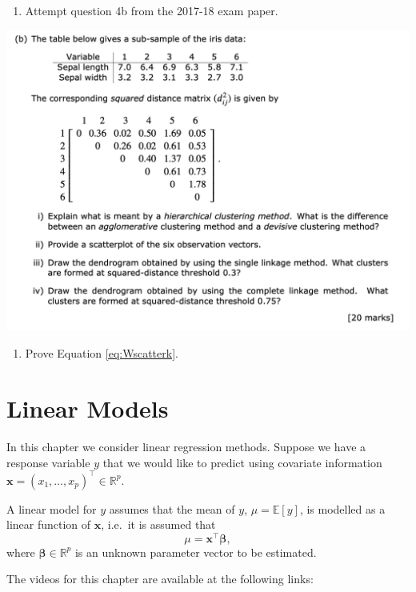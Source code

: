 \documentclass[
]{book}
\providecommand{\tightlist}{%
  \setlength{\itemsep}{0pt}\setlength{\parskip}{0pt}}
\theoremstyle{definition}
\theoremstyle{definition}
\theoremstyle{definition}
\theoremstyle{definition}
\theoremstyle{remark}
\begin{document}
\begin{enumerate}
\def\labelenumi{\arabic{enumi}.}
\setcounter{enumi}{1}
\tightlist
\item
  Attempt question 4b from the 2017-18 exam paper.
\end{enumerate}

\includegraphics{figs/Clustering_2017_18.png}

\begin{enumerate}
\def\labelenumi{\arabic{enumi}.}
\setcounter{enumi}{2}
\tightlist
\item
  Prove Equation \eqref{eq:Wscatterk}.
\end{enumerate}

\hypertarget{lm}{%
\chapter{Linear Models}\label{lm}}

In this chapter we consider linear regression methods. Suppose we have a response variable \(y\) that we would like to predict using covariate information \(\mathbf x=(x_1, \ldots, x_p)^\top \in \mathbb{R}^p\).

A linear model for \(y\) assumes that the mean of \(y\), \(\mu={\mathbb{E}}[y]\), is modelled as a linear function of \(\mathbf x\), i.e.~it is assumed that
\[
\mu = \mathbf x^\top \boldsymbol \beta,
\]
where \(\boldsymbol \beta\in \mathbb{R}^p\) is an unknown parameter vector to be estimated.

The videos for this chapter are available at the following links:
\end{document}
